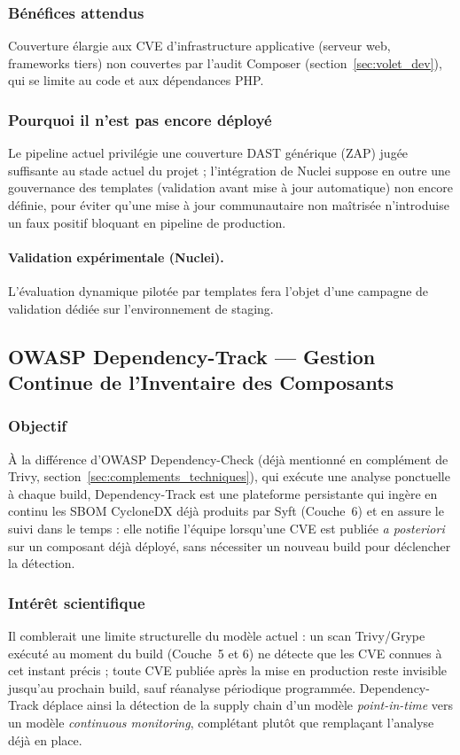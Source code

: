 \subsubsection{Bénéfices attendus}
Couverture élargie aux CVE d'infrastructure applicative (serveur web, frameworks tiers) non couvertes par l'audit Composer (section~\ref{sec:volet_dev}), qui se limite au code et aux dépendances PHP.

\subsubsection{Pourquoi il n'est pas encore déployé}
Le pipeline actuel privilégie une couverture DAST générique (ZAP) jugée suffisante au stade actuel du projet ; l'intégration de Nuclei suppose en outre une gouvernance des templates (validation avant mise à jour automatique) non encore définie, pour éviter qu'une mise à jour communautaire non maîtrisée n'introduise un faux positif bloquant en pipeline de production.

\paragraph{Validation expérimentale (Nuclei).} L'évaluation dynamique pilotée par templates fera l'objet d'une campagne de validation dédiée sur l'environnement de staging.


\subsection{OWASP Dependency-Track — Gestion Continue de l'Inventaire des Composants}
\label{subsec:dependency_track_perspective}

\subsubsection{Objectif}
À la différence d'OWASP Dependency-Check (déjà mentionné en complément de Trivy, section~\ref{sec:complements_techniques}), qui exécute une analyse ponctuelle à chaque build, Dependency-Track est une plateforme persistante qui ingère en continu les SBOM CycloneDX déjà produits par Syft (Couche~6) et en assure le suivi dans le temps : elle notifie l'équipe lorsqu'une CVE est publiée \textit{a posteriori} sur un composant déjà déployé, sans nécessiter un nouveau build pour déclencher la détection.

\subsubsection{Intérêt scientifique}
Il comblerait une limite structurelle du modèle actuel : un scan Trivy/Grype exécuté au moment du build (Couche~5 et 6) ne détecte que les CVE connues à cet instant précis ; toute CVE publiée après la mise en production reste invisible jusqu'au prochain build, sauf réanalyse périodique programmée. Dependency-Track déplace ainsi la détection de la supply chain d'un modèle \textit{point-in-time} vers un modèle \textit{continuous monitoring}, complétant plutôt que remplaçant l'analyse déjà en place.

